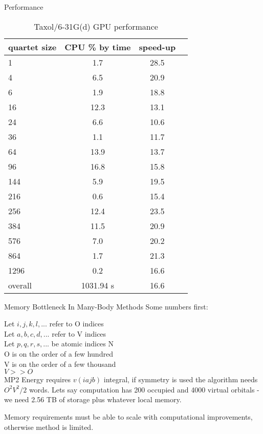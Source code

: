 \documentclass{beamer}
\begin{document}
\begin{frame}[fragile]{Performance}

\scriptsize

\begin{table}
  \label{results2}
  \caption {Taxol/6-31G(d) GPU performance}
  \begin{center}
    \begin{tabular}{| l | c | c | c |}
      \hline
      quartet size & CPU \% by time  &  speed-up \\
      \hline
      1 & 1.7 & 28.5 \\
      4 & 6.5 & 20.9 \\
      6 & 1.9 & 18.8 \\
      16 & 12.3 & 13.1 \\
      24 & 6.6 & 10.6 \\
      36 & 1.1 & 11.7 \\
      64 & 13.9 & 13.7 \\
      96 & 16.8 & 15.8 \\
      144 & 5.9 & 19.5 \\
      216 & 0.6 & 15.4 \\
      256 & 12.4 & 23.5 \\
      384 & 11.5 & 20.9 \\
      576 & 7.0 & 20.2 \\
      864 & 1.7 & 21.3 \\
      1296 & 0.2 & 16.6 \\
      \hline
      overall & 1031.94 s &  16.6 
    \end{tabular}
  \end{center}
\end{table}

\normalsize

\end{frame}


\begin{frame}{Memory Bottleneck In Many-Body Methods}
  Some numbers first:

  Let $i,j,k,l,...$ refer to O indices\\
  Let $a,b,c,d,...$ refer to V indices\\
  Let $ p,q,r,s,...$ be atomic indices N \\
  O is on the order of a few hundred \\
  V is on the order of a few thousand \\
  $V >> O$ \\
  MP2 Energy requires $v(iajb)$ integral, if symmetry is used the
  algorithm needs $O^2 V^2/2$ words.  Lets say computation has 200
  occupied and 4000 virtual orbitals - we need 2.56 TB of storage
  plus whatever local memory.

  Memory requirements must be able to scale with computational
  improvements, otherwise method is limited.
\end{frame}
\end{document}
